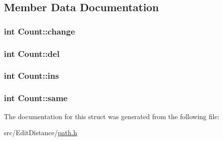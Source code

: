 \subsection{Member Data Documentation}
\hypertarget{struct_count_a5120be3eaded0f29b6ac96b0da96bef5}{
\subsubsection[{change}]{\setlength{\rightskip}{0pt plus 5cm}int Count\+::change}}\label{struct_count_a5120be3eaded0f29b6ac96b0da96bef5}
\hypertarget{struct_count_a18aa0147abb21aedf49687eb9136a220}{
\subsubsection[{del}]{\setlength{\rightskip}{0pt plus 5cm}int Count\+::del}}\label{struct_count_a18aa0147abb21aedf49687eb9136a220}
\hypertarget{struct_count_a4dfe7c57aa8334734f3c9c8cc42d58bb}{
\subsubsection[{ins}]{\setlength{\rightskip}{0pt plus 5cm}int Count\+::ins}}\label{struct_count_a4dfe7c57aa8334734f3c9c8cc42d58bb}
\hypertarget{struct_count_ae1814265c7ad81698ed5bf489f40acc1}{
\subsubsection[{same}]{\setlength{\rightskip}{0pt plus 5cm}int Count\+::same}}\label{struct_count_ae1814265c7ad81698ed5bf489f40acc1}


The documentation for this struct was generated from the following file\+:\begin{DoxyCompactItemize}
\item 
src/\+Edit\+Distance/\hyperlink{path_8h}{path.\+h}\end{DoxyCompactItemize}
